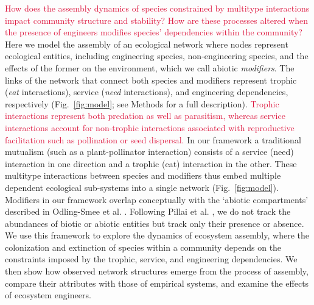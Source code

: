 \documentclass[twocolumn,preprintnumbers,amsmath,amssymb,superscriptaddress,linenumbers]{revtex4-1}
\newcommand{\rev}[1]{\textcolor{crimson}{#1}}
\begin{document}
\rev{How does the assembly dynamics of species constrained by multitype interactions impact community structure and stability?
How are these processes altered when the presence of engineers modifies species' dependencies within the community?}
Here we model the assembly of an ecological network where nodes represent ecological entities, including engineering species, non-engineering species, and the effects of the former on the environment, which we call abiotic \emph{modifiers}.
The links of the network that connect both species and modifiers represent trophic (\emph{eat} interactions), service (\emph{need} interactions), and engineering dependencies, respectively (Fig.\ \ref{fig:model}; see Methods for a full description).
\rev{Trophic interactions represent both predation as well as parasitism, whereas service interactions account for non-trophic interactions associated with reproductive facilitation such as pollination or seed dispersal.}
In our framework a traditional mutualism (such as a plant-pollinator interaction) consists of a service (need) interaction in one direction and a trophic (eat) interaction in the other.
These multitype interactions between species and modifiers thus embed multiple dependent ecological sub-systems into a single network (Fig.\ \ref{fig:model}). %
Modifiers in our framework overlap conceptually with the `abiotic compartments' described in Odling-Smee et al. \cite{OdlingSmee2013}.
Following Pillai et al. \cite{Pillai2011}, we do not track the abundances of biotic or abiotic entities but track only their presence or absence.
We use this framework to explore the dynamics of ecosystem assembly, where the colonization and extinction of species within a community depends on the constraints imposed by the trophic, service, and engineering dependencies.
We then show how observed network structures emerge from the process of assembly, compare their attributes with those of empirical systems, and examine the effects of ecosystem engineers.
\end{document}

